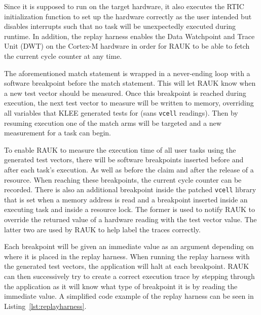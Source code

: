 Since it is supposed to run on the target hardware, it also executes the RTIC
initialization function to set up the hardware correctly as the user intended
but disables interrupts such that no task will be unexpectedly executed during
runtime. In addition, the replay harness enables the Data Watchpoint and Trace
Unit (DWT) on the Cortex-M hardware in order for RAUK to be able to fetch the
current cycle counter at any time.

The aforementioned match statement is wrapped in a never-ending loop with a
software breakpoint before the match statement. This will let RAUK know when a
new test vector should be measured. Once this breakpoint is reached during
execution, the next test vector to measure will be written to memory,
overriding all variables that KLEE generated tests for (sans \texttt{vcell}
readings). Then by resuming execution one of the match arms will be targeted
and a new measurement for a task can begin.

To enable RAUK to measure the execution time of all user tasks using the
generated test vectors, there will be software breakpoints inserted before and
after each task's execution. As well as before the claim and after the release
of a resource. When reaching these breakpoints, the current cycle counter can be
recorded. There is also an additional breakpoint inside the patched
\texttt{vcell} library that is set when a memory address is read and a breakpoint
inserted inside an executing task and inside a resource lock. The former is
used to notify RAUK to override the returned value of a hardware reading with
the test vector value. The latter two are used by RAUK to help label the
traces correctly.



Each breakpoint will be given an immediate value as an argument depending on
where it is placed in the replay harness. When running the replay harness with
the generated test vectors, the application will halt at each breakpoint. RAUK
can then successively try to create a correct execution trace by stepping
through the application as it will know what type of breakpoint it is by reading
the immediate value. A simplified code example of the replay harness can be
seen in Listing~\ref{lst:replayharness}.

